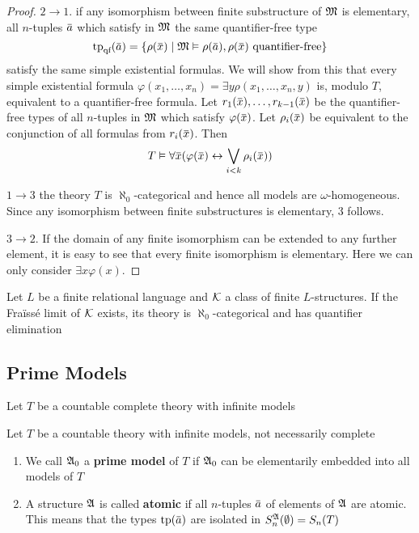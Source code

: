 \documentclass[11pt]{article}
\def \qf {\text{qf}}
\begin{document}
\begin{proof}
\(2\to 1\). if any isomorphism between finite substructure of \(\mathfrak{M}\) is elementary,
all \(n\)-tuples \(\bara\) which satisfy in \(\mathfrak{M}\) the same quantifier-free type
\begin{equation*}
\tp_{\qf}(\bara)=\{\rho(\barx)\mid\fM\vDash\rho(\bara),\rho(\barx)\text{ quantifier-free}\}
\end{equation*}
satisfy the same simple existential formulas. We will show from this that every simple
existential formula \(\varphi(x_1,\dots,x_n)=\exists y\rho(x_1,\dots,x_n,y)\) is, modulo \(T\), equivalent to a
quantifier-free formula. Let \(r_1(\barx),\dots,r_{k-1}(\barx)\) be the quantifier-free types of
all \(n\)-tuples in \(\mathfrak{M}\) which satisfy \(\varphi(\barx)\). Let \(\rho_i(\barx)\) be equivalent to the
conjunction of all formulas from \(r_i(\barx)\). Then
\begin{equation*}
T\vDash\forall \barx(\varphi(\barx)\leftrightarrow\bigvee_{i<k}\rho_i(\barx))
\end{equation*}


\(1\to 3\) the theory \(T\) is \(\aleph_0\)-categorical and hence all models are \(\omega\)-homogeneous. Since
any isomorphism between finite substructures is elementary, 3 follows.

\(3\to 2\). If the domain of any finite isomorphism can be extended to any further element, it is
easy to see that every finite isomorphism is elementary. Here we can only consider \(\exists x\varphi(x)\).
\end{proof}

\begin{theorem}[]
Let \(L\) be a finite relational language and \(\mathcal{K}\) a class of finite \(L\)-structures. If the
Fraïssé limit of \(\mathcal{K}\) exists, its theory is \(\aleph_0\)-categorical and has quantifier elimination
\end{theorem}

\subsection{Prime Models}
\label{sec:org7c40ac8}
Let \(T\) be a countable complete theory with infinite models
\begin{definition}[]
Let \(T\) be a countable theory with infinite models, not necessarily complete
\begin{enumerate}
\item We call \(\mathfrak{A}_0\) a \textbf{prime model} of \(T\) if \(\mathfrak{A}_0\) can be elementarily embedded into all
models of \(T\)
\item A structure \(\mathfrak{A}\) is called \textbf{atomic} if all \(n\)-tuples \(\bara\) of elements of \(\mathfrak{A}\) are
atomic. This means that the types \(\tp(\bara)\) are isolated in \(S_n^{\mathfrak{A}}(\emptyset)=S_n(T)\)
\end{enumerate}
\end{definition}
\end{document}
